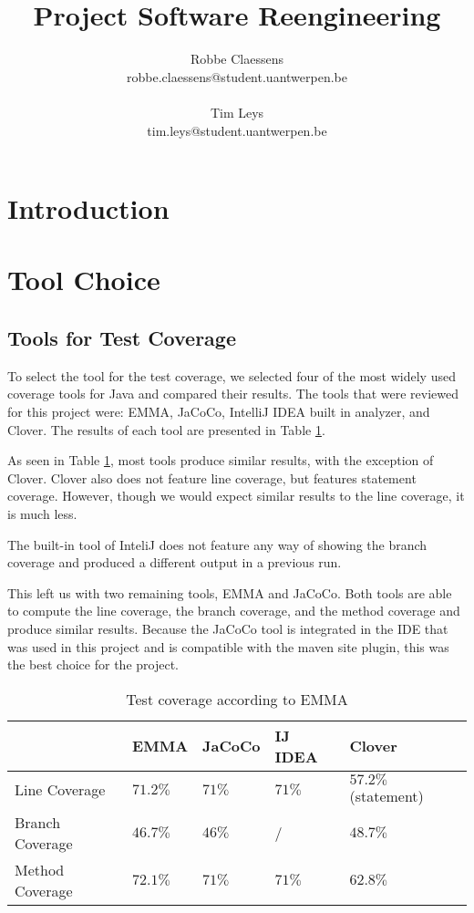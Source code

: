 \documentclass[]{article}
\title{Project Software Reengineering}
\author{Robbe Claessens \\ robbe.claessens@student.uantwerpen.be \\ \\Tim Leys\\tim.leys@student.uantwerpen.be}
\begin{document}
\maketitle



\section{Introduction}

\section{Tool Choice}

\subsection{Tools for Test Coverage}
To select the tool for the test coverage, we selected four of the most widely used coverage tools for Java and compared their results. The tools that were reviewed for this project were: EMMA, JaCoCo, IntelliJ IDEA built in analyzer, and Clover. The results of each tool are presented in Table \ref{testCoverageTools}.

As seen in Table \ref{testCoverageTools}, most tools produce similar results, with the exception of Clover. Clover also does not feature line coverage, but features statement coverage. However, though we would expect similar results to the line coverage, it is much less.

The built-in tool of InteliJ does not feature any way of showing the branch coverage and produced a different output in a previous run. 

This left us with two remaining tools, EMMA and JaCoCo. Both tools are able to compute the line coverage, the branch coverage, and the method coverage and produce similar results. Because the JaCoCo tool is integrated in the IDE that was used in this project and is compatible with the maven site plugin, this was the best choice for the project. 

\begin{table}[]
	\begin{center}
		\begin{tabular}{|l||l|l|l|l|}
			\hline
			&  EMMA & JaCoCo & IJ IDEA & Clover\\ \hline\hline
			Line Coverage	& $71.2\%$ & $71\%$ & $71\%$ &  $57.2\%$ (statement)\\
			Branch Coverage	& $46.7\%$ & $46\%$ &  / & $48.7\%$\\
			Method Coverage	& $72.1\%$ & $71\%$ & $71\%$& $62.8\%$ \\ 
			\hline
		\end{tabular}
		\caption{Test coverage according to EMMA}
		\label{testCoverageTools}
	\end{center}
	
\end{table}
\end{document}
